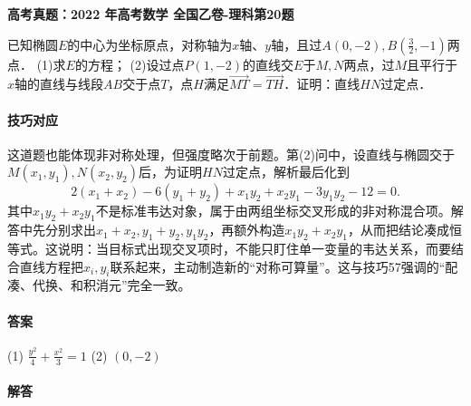 \documentclass[UTF8,a4paper,11pt]{ctexart}
\newenvironment{gaokao}[1]{\par\medskip\noindent\textbf{高考真题：#1}\par\smallskip}{\par\medskip}
\begin{document}
\begin{gaokao}{2022 年高考数学 全国乙卷-理科第20题}

已知椭圆$E$的中心为坐标原点，对称轴为$x$轴、$y$轴，且过$A(0,-2), B\left(\frac{3}{2},-1\right)$两点．
(1)求$E$的方程；
(2)设过点$P(1,-2)$的直线交$E$于$M,N$两点，过$M$且平行于$x$轴的直线与线段$AB$交于点$T$，点$H$满足$\overrightarrow{MT}=\overrightarrow{TH}$．证明：直线$HN$过定点．

\paragraph{技巧对应}

这道题也能体现非对称处理，但强度略次于前题。第(2)问中，设直线与椭圆交于$M(x_1,y_1),N(x_2,y_2)$后，为证明$HN$过定点，解析最后化到
\[
2(x_1+x_2)-6(y_1+y_2)+x_1y_2+x_2y_1-3y_1y_2-12=0.
\]
其中$x_1y_2+x_2y_1$不是标准韦达对象，属于由两组坐标交叉形成的非对称混合项。解答中先分别求出$x_1+x_2,y_1+y_2,y_1y_2$，再额外构造$x_1y_2+x_2y_1$，从而把结论凑成恒等式。这说明：当目标式出现交叉项时，不能只盯住单一变量的韦达关系，而要结合直线方程把$x_i,y_i$联系起来，主动制造新的“对称可算量”。这与技巧57强调的“配凑、代换、和积消元”完全一致。

\paragraph{答案}

(1) $\frac{y^2}{4}+\frac{x^2}{3}=1$
(2) $(0,-2)$

\paragraph{解答}


\end{gaokao}
\end{document}
